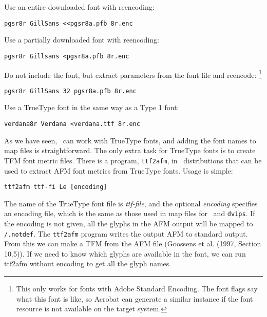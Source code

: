 Use an entire downloaded font with reencoding: 

\begin{verbatim}
pgsr8r GillSans <<pgsr8a.pfb 8r.enc 
\end{verbatim}

Use a partially downloaded font with reencoding: 

\begin{verbatim}
pgsr8r Gillsans <pgsr8a.pfb 8r.enc 
\end{verbatim}
 
Do not include the font, but extract parameters from the font file and reencode: \footnote{
This only works for fonts with Adobe Standard Encoding. The font flags say what this font is like, 
so Acrobat can generate a similar instance if the font resource is not available on the target system. 
}

\begin{verbatim}
pgsr8r GillSans 32 pgsr8a.pfb 8r.enc 
\end{verbatim}

Use a TrueType font in the same way as a Type 1 font: 

\begin{verbatim}
verdana8r Verdana <verdana.ttf 8r.enc 
\end{verbatim}


As we have seen, \pdfTEX\  can work with TrueType fonts, and adding the font names 
to map files is straightforward. The only extra task for TrueType fonts is to create 
TFM font metric files. There is a program, \verb|ttf2afm|, in \pdfTEX\  distributions that 
can be used to extract AFM font metrics from TrueType fonts. Usage is simple: 

\begin{verbatim}
ttf2afm ttf-fi Le [encoding] 
\end{verbatim}

The name of the TrueType font file is \emph{ttf-file}, and the optional
\emph{encoding} specifies an 
encoding file, which is the same as those used in map files for \pdfTEX\  and \verb|dvips|. 
If the encoding is not given, all the glyphs in the AFM output will be mapped to 
\verb|/.notdef|. The \verb|ttf2afm| program writes the output AFM to standard output. From 
this we can make a TFM from the AFM file (Goossens et al. (1997, Section 10.5)). 
If we need to know which glyphs are available in the font, we can run ttf2afm 
without encoding to get all the glyph names. 

